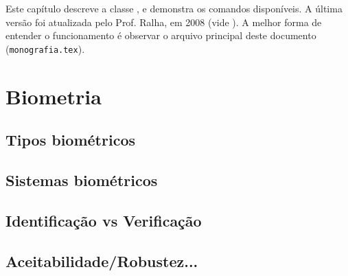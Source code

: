 \newcommand{\texCommand}[1]{\texttt{\textbackslash{#1}}}%

\newcommand{\exemplo}[1]{%
\vspace{\baselineskip}%
\noindent\fbox{\begin{minipage}{\textwidth}#1\end{minipage}}%
\\\vspace{\baselineskip}}%

\newcommand{\exemploVerbatim}[1]{%
\vspace{\baselineskip}%
\noindent\fbox{\begin{minipage}{\textwidth}%
#1\end{minipage}}%
\\\vspace{\baselineskip}}%


Este capítulo descreve a classe \unbcic, e demonstra os comandos disponíveis. A
última versão foi atualizada pelo Prof. Ralha, em 2008 (vide ).
A melhor forma de entender o funcionamento é observar o arquivo principal deste
documento (\texttt{monografia.tex}).

\section{Biometria} \label{sec:fundamentacao:biometria}

\subsection{Tipos biométricos}

\subsection{Sistemas biométricos}

\subsection{Identificação vs Verificação}

\subsection{Aceitabilidade/Robustez...}


